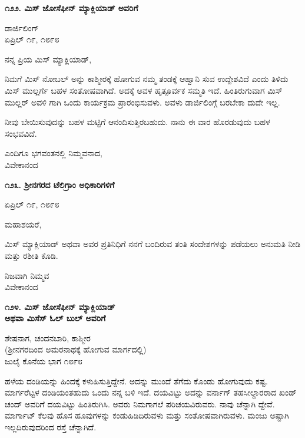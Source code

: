 \begin{center}
\textbf{೧೨೨. ಮಿಸ್ ಜೋಸೆಫೀನ್ ಮ್ಯಾಕ್ಲಿಯಾಡ್ ಅವರಿಗೆ}
\end{center}

\begin{flushright}
ಡಾರ್ಜಿಲಿಂಗ್\\ಏಪ್ರಿಲ್ ೧೯, ೧೮೯೮
\end{flushright}

ನನ್ನ ಪ್ರಿಯ ಮಿಸ್ ಮ್ಯಾಕ್ಲಿಯಾಡ್,

ನಿಮಗೆ ಮಿಸ್ ನೋಬಲ್ ಅನ್ನು ಕಾಶ್ಮೀರಕ್ಕೆ ಹೋಗುವ ನಮ್ಮ ತಂಡಕ್ಕೆ ಆಹ್ವಾನಿ ಸುವ ಉದ್ದೇಶವಿದೆ ಎಂದು ತಿಳಿದು ಮಿಸ್ ಮುಲ್ಲರ್ಗೆ ಬಹಳ ಸಂತೋಷವಾಗಿದೆ. ಅದಕ್ಕೆ ಅವಳ ಹೃತ್ಪೂರ್ವಕ ಸಮ್ಮತಿ ಇದೆ. ಹಿಂತಿರುಗುವಾಗ ಮಿಸ್ ಮುಲ್ಲರ್ ಅವಳಿ ಗಾಗಿ ಒಂದು ಕಾರ್ಯಕ್ರಮ ಪ್ರಾರಂಭಿಸುವಳು. ಅವಳು ಡಾರ್ಜಿಲಿಂಗ್ಗೆ ಬರಬೇಕಾ ದುದೇ ಇಲ್ಲ.

ನೀವು ಬೇಯಿಸುವುದನ್ನು ಬಹಳ ಮಟ್ಟಿಗೆ ಆನಂದಿಸುತ್ತಿರಬಹುದು. ನಾನು ಈ ವಾರ ಹೊರಡುವುದು ಬಹಳ ಸಂಭವವಿದೆ.

\begin{flushright}
ಎಂದಿಗೂ ಭಗವಂತನಲ್ಲಿ ನಿಮ್ಮವನಾದ,\\ವಿವೇಕಾನಂದ
\end{flushright}

\begin{center}
\textbf{೧೨೩. ಶ‍್ರೀನಗರದ ಟೆಲಿಗ್ರಾಂ ಅಧಿಕಾರಿಗಳಿಗೆ}
\end{center}

\begin{flushright}
ಏಪ್ರಿಲ್ ೧೯, ೧೮೯೮
\end{flushright}

ಮಹಾಶಯರೆ,

ಮಿಸ್ ಮ್ಯಾಕ್ಲಿಯಾಡ್ ಅಥವಾ ಅವರ ಪ್ರತಿನಿಧಿಗೆ ನನಗೆ ಬಂದಿರುವ ತಂತಿ ಸಂದೇಶಗಳನ್ನು ಪಡೆಯಲು ಅನುಮತಿ ನೀಡಿ ಮತ್ತು ರಶೀತಿ ಕೊಡಿ.

\begin{flushright}
ನಿಜವಾಗಿ ನಿಮ್ಮವ\\ವಿವೇಕಾನಂದ
\end{flushright}

\begin{center}
\textbf{೧೨೪. ಮಿಸ್ ಜೋಸೆಫೀನ್ ಮ್ಯಾಕ್ಲಿಯಾಡ್\\ಅಥವಾ ಮಿಸೆಸ್ ಓಲ್ ಬುಲ್ ಅವರಿಗೆ}
\end{center}

\begin{flushright}
ಶೇಷನಾಗ, ಚಂದನಬಾರಿ, ಕಾಶ್ಮೀರ\\(ಶ‍್ರೀನಗರದಿಂದ ಅಮರನಾಥಕ್ಕೆ ಹೋಗುವ ಮಾರ್ಗದಲ್ಲಿ)\\ಜುಲೈ ಕೊನೆಯ ಭಾಗ ೧೮೯೮
\end{flushright}

ಹಳೆಯ ದಂಡಿಯನ್ನು ಹಿಂದಕ್ಕೆ ಕಳುಹಿಸುತ್ತಿದ್ದೇನೆ. ಅದನ್ನು ಮುಂದೆ ತೆಗೆದು ಕೊಂಡು ಹೋಗುವುದು ಕಷ್ಟ. ಮಾರ್ಗರೆಟ್ಟಳ ದಂಡಿಯಂತಹುದು ಒಂದು ನನ್ನ ಬಳಿ ಇದೆ. ದಯವಿಟ್ಟು ಅದನ್ನು ವರ್ನಾಗ್ ತಹಸೀಲ್ದಾರರಾದ ಖಂಡ್ ಚಂದ್ ಅವರಿಗೆ ದಯವಿಟ್ಟು ಹಿಂತಿರುಗಿಸಿ. ಅವರು ನಿಮಗಾಗಲೆ ಪರಿಚಯವಿರುವರು. ನಾವು ಚೆನ್ನಾಗಿ ದ್ದೇವೆ. ಮಾರ್ಗಾಟ್ ಕೆಲವು ಹೊಸ ಹೂವುಗಳನ್ನು ಕಂಡುಹಿಡಿದಿರುವಳು ಮತ್ತು ಸಂತೋಷವಾಗಿರುವಳು. ಮಂಜು ಅಷ್ಟಾಗಿ ಇಲ್ಲದಿರುವುದರಿಂದ ರಸ್ತೆ ಚೆನ್ನಾಗಿದೆ.


